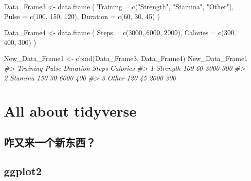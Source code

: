 \documentclass[
]{book}
\newenvironment{Shaded}{\begin{snugshade}}{\end{snugshade}}
\newcommand{\AttributeTok}[1]{\textcolor[rgb]{0.77,0.63,0.00}{#1}}
\newcommand{\CommentTok}[1]{\textcolor[rgb]{0.56,0.35,0.01}{\textit{#1}}}
\newcommand{\DecValTok}[1]{\textcolor[rgb]{0.00,0.00,0.81}{#1}}
\newcommand{\FunctionTok}[1]{\textcolor[rgb]{0.00,0.00,0.00}{#1}}
\newcommand{\NormalTok}[1]{#1}
\newcommand{\OtherTok}[1]{\textcolor[rgb]{0.56,0.35,0.01}{#1}}
\newcommand{\StringTok}[1]{\textcolor[rgb]{0.31,0.60,0.02}{#1}}
\begin{document}
\begin{Shaded}
\begin{Highlighting}[]
\NormalTok{Data\_Frame3 }\OtherTok{\textless{}{-}} \FunctionTok{data.frame}\NormalTok{ (}
  \AttributeTok{Training =} \FunctionTok{c}\NormalTok{(}\StringTok{"Strength"}\NormalTok{, }\StringTok{"Stamina"}\NormalTok{, }\StringTok{"Other"}\NormalTok{),}
  \AttributeTok{Pulse =} \FunctionTok{c}\NormalTok{(}\DecValTok{100}\NormalTok{, }\DecValTok{150}\NormalTok{, }\DecValTok{120}\NormalTok{),}
  \AttributeTok{Duration =} \FunctionTok{c}\NormalTok{(}\DecValTok{60}\NormalTok{, }\DecValTok{30}\NormalTok{, }\DecValTok{45}\NormalTok{)}
\NormalTok{)}

\NormalTok{Data\_Frame4 }\OtherTok{\textless{}{-}} \FunctionTok{data.frame}\NormalTok{ (}
  \AttributeTok{Steps =} \FunctionTok{c}\NormalTok{(}\DecValTok{3000}\NormalTok{, }\DecValTok{6000}\NormalTok{, }\DecValTok{2000}\NormalTok{),}
  \AttributeTok{Calories =} \FunctionTok{c}\NormalTok{(}\DecValTok{300}\NormalTok{, }\DecValTok{400}\NormalTok{, }\DecValTok{300}\NormalTok{)}
\NormalTok{)}

\NormalTok{New\_Data\_Frame1 }\OtherTok{\textless{}{-}} \FunctionTok{cbind}\NormalTok{(Data\_Frame3, Data\_Frame4)}
\NormalTok{New\_Data\_Frame1}
\CommentTok{\#\textgreater{}   Training Pulse Duration Steps Calories}
\CommentTok{\#\textgreater{} 1 Strength   100       60  3000      300}
\CommentTok{\#\textgreater{} 2  Stamina   150       30  6000      400}
\CommentTok{\#\textgreater{} 3    Other   120       45  2000      300}
\end{Highlighting}
\end{Shaded}

\hypertarget{all-about-tidyverse}{%
\chapter*{All about tidyverse}\label{all-about-tidyverse}}

\hypertarget{ux548bux53c8ux6765ux4e00ux4e2aux65b0ux4e1cux897f}{%
\section{咋又来一个新东西？}\label{ux548bux53c8ux6765ux4e00ux4e2aux65b0ux4e1cux897f}}

\hypertarget{ggplot2}{%
\section{ggplot2}\label{ggplot2}}
\end{document}
